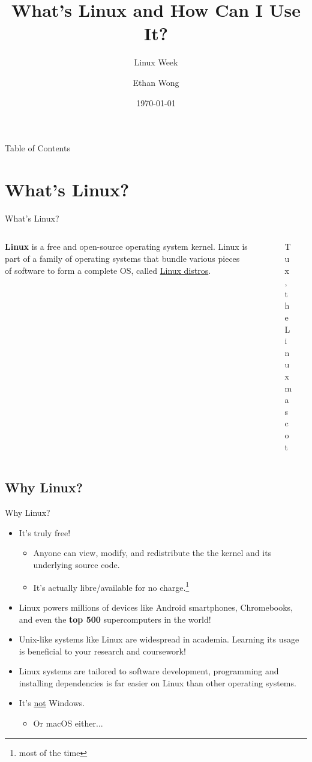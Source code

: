 \documentclass{beamer}
\title{What's Linux and How Can I Use It?}
\author{Ethan Wong}
\subtitle{Linux Week \the\year{}}
\institute{Linux Users Group @ UIC}
\date{\today}
\begin{document}
\begin{frame}
	\titlepage
\end{frame}

\begin{frame}{Table of Contents}
	\tableofcontents[pausesections]
\end{frame}

\section{What's Linux?}
\begin{frame}{What's Linux?}
	\begin{columns}
		\begin{column}{0.5\textwidth}
			\textbf{Linux} is a free and open-source operating
			system kernel. Linux is part of a family of operating
			systems that bundle various pieces of software to form
			a complete OS, called \underline{Linux distros}.
		\end{column}
		\begin{column}{0.5\textwidth}
			\begin{figure}
				\centering
				
				\caption{Tux, the Linux mascot}
			\end{figure}
		\end{column}
	\end{columns}
\end{frame}

\subsection{Why Linux?}
\begin{frame}{Why Linux?}
	\begin{itemize}
		\item It's truly free!
			\pause
			\begin{itemize}
				\item Anyone can view, modify, and redistribute
					the the kernel and its underlying
					source code.
					\pause
				\item It's actually libre/available for no
					charge.\footnote{most of the time}
					\pause
			\end{itemize}
		\item Linux powers millions of devices like Android
			smartphones, Chromebooks, and even the \textbf{top 500}
			supercomputers in the world!
			\pause
		\item Unix-like systems like Linux are widespread in academia.
			Learning its usage is beneficial to your research and
			coursework!
			\pause
		\item Linux systems are tailored to software development,
			programming and installing dependencies is far easier
			on Linux than other operating systems.
			\pause
		\item It's \underline{not} Windows.
			\pause
			\begin{itemize}
				\item Or macOS either...
			\end{itemize}
			\pause
	\end{itemize}
\end{frame}
\end{document}
